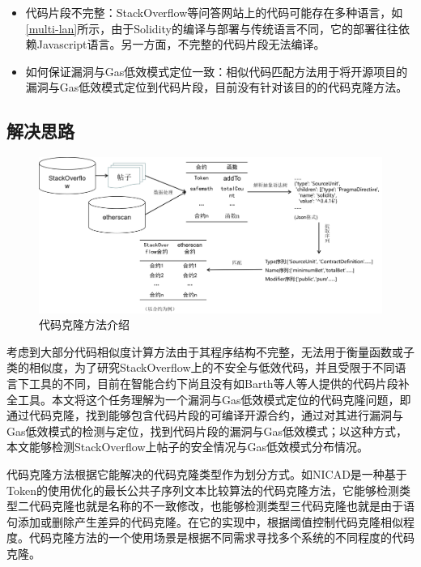 \begin{itemize}

    \item 代码片段不完整：StackOverflow等问答网站上的代码可能存在多种语言，如\ref{multi-lan}所示，由于Solidity的编译与部署与传统语言不同，它的部署往往依赖Javascript语言。另一方面，不完整的代码片段无法编译。

    \item 如何保证漏洞与Gas低效模式定位一致：相似代码匹配方法用于将开源项目的漏洞与Gas低效模式定位到代码片段，目前没有针对该目的的代码克隆方法。
    
\end{itemize}

\subsection{解决思路}

\begin{figure}[htbp]
\centering
\includegraphics[width=1\textwidth]{figures/chapter2Overview.png}
\caption{代码克隆方法介绍}
\label{chapter2Overview}
\end{figure}

考虑到大部分代码相似度计算方法由于其程序结构不完整，无法用于衡量函数或子类的相似度，为了研究StackOverflow上的不安全与低效代码，并且受限于不同语言下工具的不同，目前在智能合约下尚且没有如Barth等人\cite{partial_java}等人提供的代码片段补全工具。本文将这个任务理解为一个漏洞与Gas低效模式定位的代码克隆问题，即通过代码克隆，找到能够包含代码片段的可编译开源合约，通过对其进行漏洞与Gas低效模式的检测与定位，找到代码片段的漏洞与Gas低效模式；以这种方式，本文能够检测StackOverflow上帖子的安全情况与Gas低效模式分布情况。

代码克隆方法根据它能解决的代码克隆类型作为划分方式。如NICAD\cite{nicad}是一种基于Token的使用优化的最长公共子序列文本比较算法的代码克隆方法，它能够检测类型二代码克隆也就是名称的不一致修改，也能够检测类型三代码克隆也就是由于语句添加或删除产生差异的代码克隆。在它的实现中，根据阈值控制代码克隆相似程度。代码克隆方法的一个使用场景是根据不同需求寻找多个系统的不同程度的代码克隆。

